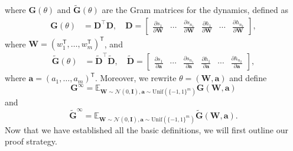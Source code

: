 \documentclass{article}
\newcommand{\T}{\mathsf{T}}
\begin{document}
where $\mathbf{G}(\theta)$ and $\mathbf{\widetilde{G}}(\theta)$ are the Gram matrices for the dynamics, defined as
\begin{align}
\mathbf{G}(\theta) &= \mathbf{D}^{\top} \mathbf{D}, \quad
\mathbf{D} = \begin{bmatrix}
\frac{\partial s_1}{\partial \mathbf{W}} & \cdots & \frac{\partial s_{n_1}}{\partial \mathbf{W}} & \frac{\partial h_1}{\partial \mathbf{W}} & \cdots & \frac{\partial h_{n_2}}{\partial \mathbf{W}} 
\end{bmatrix},
\end{align}
where $\mathbf{W}=(w_1^\T,\ldots, w_m^\T)^\T$, 
and 
\begin{align}
\widetilde{\mathbf{G}}(\theta) &= \widetilde{\mathbf{D}}^{\top} \widetilde{\mathbf{D}}, \quad
\widetilde{\mathbf{D}} = \begin{bmatrix}
\frac{\partial s_1}{\partial \mathbf{a}} & \cdots & \frac{\partial s_{n_1}}{\partial \mathbf{a}} & \frac{\partial h_1}{\partial \mathbf{a}} & \cdots & \frac{\partial h_{n_2}}{\partial \mathbf{a}}
\end{bmatrix},
\end{align}
where $\mathbf{a}=(a_1, \ldots, a_m)^\T$.
Moreover, we rewrite $\theta=(\mathbf{W},\mathbf{a})$ and define 
\begin{equation*}
    \mathbf{G}^{\infty}=\mathbb{E}_{\mathbf{W}\sim \mathcal{N}(0,\mathbf{I}), \mathbf{a}\sim\text{Unif}(\{-1,1\}^{m})}\mathbf{G}(\mathbf{W},\mathbf{a})
\end{equation*}
and
\begin{equation*}
\mathbf{\widetilde{G}}^{\infty}=\mathbb{E}_{\mathbf{W}\sim \mathcal{N}(0,\mathbf{I}), \mathbf{a}\sim\text{Unif}(\{-1,1\}^{m})}\mathbf{\widetilde{G}}(\mathbf{W},\mathbf{a}) .
\end{equation*}
Now that we have established all the basic definitions, we will first outline our proof strategy.
\end{document}
